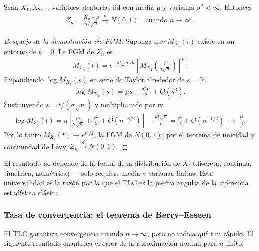 \begin{teorema}
 \label{eq:5.2.1}
Sean $X_1, X_2, \ldots$ variables aleatorias iid con media $\mu$ y varianza
$\sigma^2 < \infty$. Entonces
\begin{align}
 Z_n = \frac{\bar{X}_n - \mu}{\sigma/\sqrt{n}} \xrightarrow{d} N(0,1)
 \quad \text{cuando } n \to \infty.
\end{align}
\end{teorema}

\begin{proof}[Bosquejo de la demostraci\'on v\'ia FGM]
Suponga que $M_{X_1}(t)$ existe en un entorno de $t=0$. La FGM de $Z_n$ es
\begin{align}
 M_{Z_n}(t) = e^{-\mu t \sqrt{n}/\sigma}\left[M_{X_1}\!\left(\frac{t}{\sigma\sqrt{n}}\right)\right]^n.
\end{align}
Expandiendo $\log M_{X_1}(s)$ en serie de Taylor alrededor de $s=0$:
\begin{align}
 \log M_{X_1}(s) = \mu s + \frac{\sigma^2 s^2}{2} + O(s^3).
\end{align}
Sustituyendo $s = t/(\sigma\sqrt{n})$ y multiplicando por $n$:
\begin{align}
 \log M_{Z_n}(t) = n\left[\frac{\mu t}{\sigma\sqrt{n}} + \frac{t^2}{2n} + O(n^{-3/2})\right]
 - \frac{\mu t\sqrt{n}}{\sigma} = \frac{t^2}{2} + O(n^{-1/2}) \;\longrightarrow\; \frac{t^2}{2}.
\end{align}
Por lo tanto $M_{Z_n}(t) \to e^{t^2/2}$, la FGM de $N(0,1)$; por el teorema de
unicidad y continuidad de L\'evy, $Z_n \xrightarrow{d} N(0,1)$.
\end{proof}

\begin{observacion}
El resultado no depende de la forma de la distribuci\'on de $X_i$ (discreta,
continua, sim\'etrica, asim\'etrica) --- solo requiere media y varianza finitas.
Esta universalidad es la raz\'on por la que el TLC es la piedra angular de la
inferencia estad\'istica cl\'asica.
\end{observacion}

\subsubsection{Tasa de convergencia: el teorema de Berry--Esseen}

El TLC garantiza convergencia cuando $n \to \infty$, pero no indica qu\'e tan
r\'apido. El siguiente resultado cuantifica el error de la aproximaci\'on normal
para $n$ finito.

